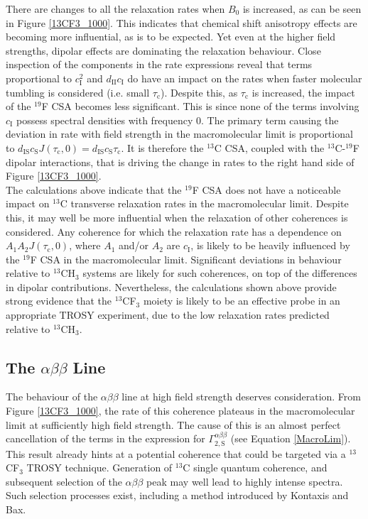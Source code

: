 There are changes to all the relaxation rates when $B_0$ is increased, as can be seen in Figure \ref{13CF3_1000}. This indicates that chemical shift anisotropy effects are becoming more influential, as is to be expected. Yet even at the higher field strengths, dipolar effects are dominating the relaxation behaviour. Close inspection of the components in the rate expressions reveal that terms proportional to $c_{\text{I}}^2$ and $d_{\text{II}} c_{\text{I}}$ do have an impact on the rates when faster molecular tumbling is considered (i.e. small $\tau_{\text{c}}$). Despite this, as $\tau_{\text{c}}$ is increased, the impact of the $^{19}$F CSA becomes less significant. This is since none of the terms involving $c_{\text{I}}$ possess spectral densities with frequency $0$. The primary term causing the deviation in rate with field strength in the macromolecular limit is proportional to $d_{\text{IS}}c_{\text{S}} J\left(\tau_{\text{c}}, 0\right) = d_{\text{IS}}c_{\text{S}} \tau_{\text{c}}$. It is therefore the $^{13}$C CSA, coupled with the $^{13}$C-$^{19}$F dipolar interactions, that is driving the change in rates to the right hand side of Figure \ref{13CF3_1000}.\\
The calculations above indicate that the $^{19}$F CSA does not have a noticeable impact on $^{13}$C transverse relaxation rates in the macromolecular limit. Despite this, it may well be more influential when the relaxation of other coherences is considered. Any coherence for which the relaxation rate has a dependence on $A_1 A_2 J(\tau_{\text{c}},0)$, where $A_1$ and/or $A_2$ are $c_{\text{I}}$, is likely to be heavily influenced by the $^{19}$F CSA in the macromolecular limit. Significant deviations in behaviour relative to $^{13}$CH$_3$ systems are likely for such coherences, on top of the differences in dipolar contributions. Nevertheless, the calculations shown above provide strong evidence that the $^{13}$CF$_3$ moiety is likely to be an effective probe in an appropriate TROSY experiment, due to the low relaxation rates predicted relative to $^{13}$CH$_3$.
\subsection{The $\alpha \beta \beta$ Line}
The behaviour of the $\alpha \beta \beta$ line at high field strength deserves consideration. From Figure \ref{13CF3_1000}, the rate of this coherence plateaus in the macromolecular limit at sufficiently high field strength. The cause of this is an almost perfect cancellation of the terms in the expression for $\Gamma_{2,\text{S}}^{\alpha\beta\beta}$ (see Equation \ref{MacroLim}). This result already hints at a potential coherence that could be targeted via a $^{13}$CF$_3$ TROSY technique. Generation of $^{13}$C single quantum coherence, and subsequent selection of the $\alpha \beta \beta$ peak may well lead to highly intense spectra. Such selection processes exist, including a method introduced by Kontaxis and Bax\cite{RN3}.
